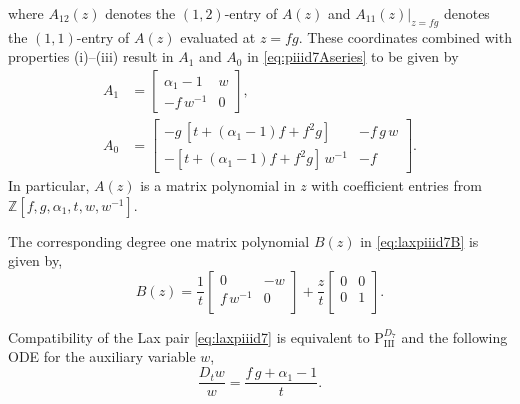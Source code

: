 \documentclass[a4paper,reqno]{amsart}
\numberwithin{equation}{section}
\numberwithin{figure}{section}
\theoremstyle{remark}
\newcommand\Pthree{\textrm{P}_{\textrm{III}}}
\begin{document}
where $A_{12}(z)$ denotes the $(1,2)$-entry of $A(z)$ and $A_{11}(z)|_{z=fg}$ denotes the $(1,1)$-entry of $A(z)$ evaluated at $z=fg$. 
These coordinates combined with properties (i)--(iii) result in $A_1$ and $A_0$ in \eqref{eq:piiid7Aseries} to be given by
\begin{align*}
A_1&=\begin{bmatrix}
 \alpha_1-1 & w\\
 -f\,w^{-1} & 0
\end{bmatrix},\\
A_0&=\begin{bmatrix}
-g\,[t+(\alpha_1-1)f+f^2g] & -f\, g\, w\\
-[t+(\alpha_1-1)f+f^2g]\,w^{-1}& -f
\end{bmatrix}.
\end{align*}
In particular, $A(z)$ is a matrix polynomial in $z$ with coefficient entries from $\mathbb{Z}[f,g,\alpha_1,t,w,w^{-1}]$.


The corresponding degree one matrix polynomial $B(z)$ in \eqref{eq:laxpiiid7B} is given by,
\begin{equation*}
    B(z)=\frac{1}{t}\begin{bmatrix}
 0 & -w \\
 f\,w^{-1} & 0 \\
\end{bmatrix}+\frac{z}{t}\begin{bmatrix}
 0 & 0 \\
 0 & 1\\
\end{bmatrix}.
\end{equation*}



Compatibility of the Lax pair \eqref{eq:laxpiiid7} is equivalent to $\Pthree^{D_7}$ and the following ODE for the auxiliary variable $w$,
\begin{equation*}
    \frac{D_tw}{w}=\frac{f\,g+\alpha_1-1}{t}.
\end{equation*}
\end{document}
